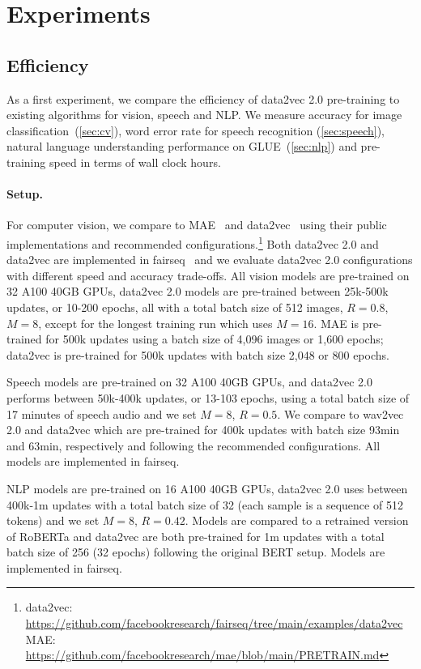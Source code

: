 \documentclass[nohyperref]{article}
\theoremstyle{plain}
\theoremstyle{definition}
\theoremstyle{remark}
\newcommand{\name}{data2vec 2.0}
\begin{document}
\section{Experiments}
\label{sec:results}


\subsection{Efficiency}

As a first experiment, we compare the efficiency of \name{} pre-training to existing algorithms for vision, speech and NLP. 
We measure accuracy for image classification~(\textsection\ref{sec:cv}), word error rate for speech recognition (\textsection\ref{sec:speech}), natural language understanding performance on GLUE~(\textsection\ref{sec:nlp}) and pre-training speed in terms of wall clock hours.

\paragraph{Setup.}
For computer vision, we compare to MAE~\citep{he2021mae} and data2vec~\citep{baevski2020wav} using their public implementations and recommended configurations.\footnote{data2vec: {\scriptsize\url{https://github.com/facebookresearch/fairseq/tree/main/examples/data2vec}} MAE: {\scriptsize\url{https://github.com/facebookresearch/mae/blob/main/PRETRAIN.md}}
}
Both \name{} and data2vec are implemented in fairseq~\citep{ott2019fairseq} and we evaluate \name{} configurations with different speed and accuracy trade-offs.
All vision models are pre-trained on 32 A100 40GB GPUs, \name{} models are pre-trained between 25k-500k updates, or 10-200 epochs, all with a total batch size of 512 images, $R=0.8$, $M=8$, except for the longest training run which uses $M=16$.
MAE is pre-trained for 500k updates using a batch size of 4,096 images or 1,600 epochs; data2vec is pre-trained for 500k updates with batch size 2,048 or 800 epochs.

Speech models are pre-trained on 32 A100 40GB GPUs, and \name{} performs between 50k-400k updates, or 13-103 epochs, using a total batch size of 17 minutes of speech audio and we set $M=8$, $R=0.5$. 
We compare to wav2vec 2.0 and data2vec which are pre-trained for 400k updates with batch size 93min and 63min, respectively and following the recommended configurations. 
All models are implemented in fairseq.

NLP models are pre-trained on 16 A100 40GB GPUs, \name{} uses between 400k-1m updates with a total batch size of 32 (each sample is a sequence of 512 tokens) and we set $M=8$, $R=0.42$.
Models are compared to a retrained version of RoBERTa and data2vec are both pre-trained for 1m updates with a total batch size of 256 (32 epochs) following the original BERT setup.
Models are implemented in fairseq.
\end{document}
